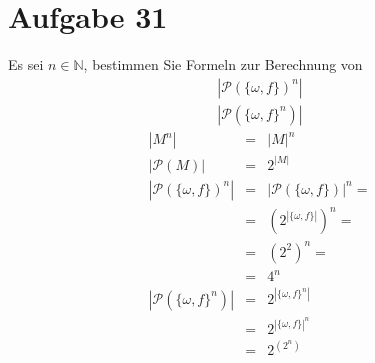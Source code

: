 \documentclass[10pt, oneside]{article}
\begin{document}
\section{Aufgabe 31}

Es sei $n \in \mathbb{N}$, bestimmen Sie Formeln zur Berechnung von
\begin{equation*}
    \begin{gathered}
        |\mathcal{P}(\{\omega, f\})^n| \\
        |\mathcal{P}(\{\omega, f\}^n)|
    \end{gathered}
\end{equation*}
\begin{equation*}
    \begin{array}{rcl}
        |M^n| &=& |M|^n \\[5pt]
        |\mathcal{P}(M)| &=& 2^{|M|} \\[10pt]
        |\mathcal{P}(\{\omega, f\})^n| &=& |\mathcal{P}(\{\omega, f\})|^n = \\[5pt]
                                       &=& (2^{|\{\omega, f\}|})^n = \\[5pt]
                                       &=& (2^2)^n = \\[5pt]
                                       &=& 4^n \\[10pt]
        |\mathcal{P}(\{\omega, f\}^n)| &=& 2^{|\{\omega, f\}^n|} \\[5pt]
                                       &=& 2^{|\{\omega, f\}|^n} \\[5pt]
                                       &=& 2^{(2^n)}
    \end{array}
\end{equation*}
\end{document}
